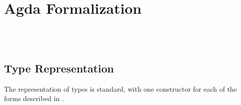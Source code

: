 \section{Agda Formalization}
\label{sec:formalization}

\begin{code}[hide]%
\>[0]\AgdaSpace{}%
\AgdaSpace{}%
\AgdaSpace{}%
\AgdaSpace{}%
\AgdaSymbol{(}\AgdaSymbol{;}\AgdaSpace{}%
\AgdaOperator{\AgdaInductiveConstructor{\AgdaUnderscore{},\AgdaUnderscore{}}}\AgdaSymbol{;}\AgdaSpace{}%
\AgdaSymbol{;}\AgdaSpace{}%
\AgdaSymbol{)}\<%
\\
\>[0]\AgdaSpace{}%
\AgdaSpace{}%
\AgdaSpace{}%
\AgdaSpace{}%
\AgdaSymbol{(}\AgdaSymbol{;}\AgdaSpace{}%
\AgdaSymbol{;}\AgdaSpace{}%
\AgdaSymbol{;}\AgdaSpace{}%
\AgdaSymbol{)}\<%
\\
\>[0]\AgdaSpace{}%
\AgdaSpace{}%
\AgdaSpace{}%
\AgdaSpace{}%
\AgdaSymbol{(}\AgdaSymbol{;}\AgdaSpace{}%
\AgdaInductiveConstructor{[]}\AgdaSymbol{;}\AgdaSpace{}%
\AgdaSymbol{;}\AgdaSpace{}%
\AgdaOperator{\AgdaFunction{[\AgdaUnderscore{}]}}\AgdaSymbol{;}\AgdaSpace{}%
\AgdaOperator{\AgdaFunction{\AgdaUnderscore{}++\AgdaUnderscore{}}}\AgdaSymbol{)}\<%
\end{code}

\subsection{Type Representation}
\label{sec:type-agda}

The representation of types is standard, with one constructor for each of the
forms described in .


